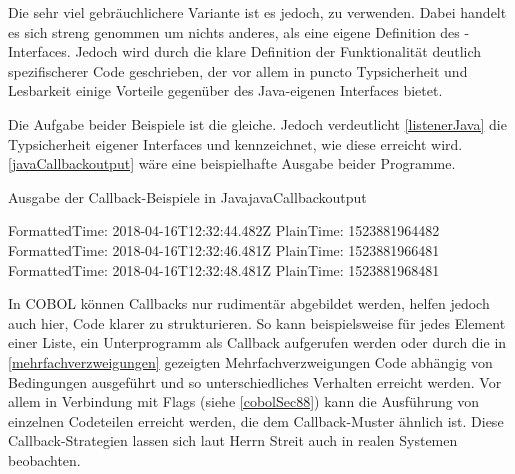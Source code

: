 
Die sehr viel gebräuchlichere Variante ist es jedoch,  zu verwenden. Dabei handelt es sich streng genommen um nichts anderes, als eine eigene Definition des -Interfaces. Jedoch wird durch die klare Definition der Funktionalität deutlich spezifischerer Code geschrieben, der vor allem in puncto Typsicherheit und Lesbarkeit einige Vorteile gegenüber des Java-eigenen Interfaces bietet.


Die Aufgabe beider Beispiele ist die gleiche. Jedoch verdeutlicht \autoref{listenerJava} die Typsicherheit eigener Interfaces und kennzeichnet, wie diese erreicht wird. \autoref{javaCallbackoutput} wäre eine beispielhafte Ausgabe beider Programme.

\begin{codeWithCaption}{Ausgabe der Callback-Beispiele in Java}{javaCallbackoutput}
    \begin{shellwindow}
    FormattedTime: 2018-04-16T12:32:44.482Z
    PlainTime: 1523881964482
    FormattedTime: 2018-04-16T12:32:46.481Z
    PlainTime: 1523881966481
    FormattedTime: 2018-04-16T12:32:48.481Z
    PlainTime: 1523881968481
    \end{shellwindow}
\end{codeWithCaption}

In COBOL können Callbacks nur rudimentär abgebildet werden, helfen jedoch auch hier, Code klarer zu strukturieren. So kann beispielsweise für jedes Element einer Liste, ein Unterprogramm als Callback aufgerufen werden oder durch die in \autoref{mehrfachverzweigungen} gezeigten Mehrfachverzweigungen Code abhängig von Bedingungen ausgeführt und so unterschiedliches Verhalten erreicht werden. Vor allem in Verbindung mit Flags (siehe \autoref{cobolSec88}) kann die Ausführung von einzelnen Codeteilen erreicht werden, die dem Callback-Muster ähnlich ist. Diese Callback-Strategien lassen sich laut Herrn Streit auch in realen Systemen beobachten.